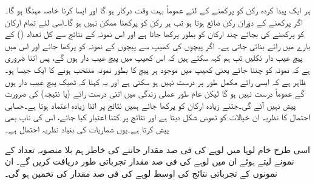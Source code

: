 ہر ایک پیدا کردہ رکن کو پرکھنے کے لئے عموماً بہت وقت درکار  ہو  گا اور ایسا کرنا خاصہ مہنگا ہو گا۔اگر پرکھنے کے دوران رکن ضائع ہوتا ہو تب ہر رکن کو پرکھنا ممکن نہیں ہو گا۔اسی لئے تمام ارکان کو پرکھنے کی بجائے چند ارکان کو بطور  پرکھا جاتا ہے اور اس نمونہ کے نتائج سے کل تعداد () کے بارے میں رائے بنائی جاتی ہے۔ اگر  پیچوں کی کھیپ  سے  پیچوں کے نمونہ کو پرکھا جائے اور اس میں  پیچ عیب دار نکلیں تب ہم کہہ سکتے ہیں کہ اس کھیپ میں  پیچ عیب دار ہوں گے، پس اتنا ضروری ہے کہ نمونہ کو   چننا جائے یعنی کھیپ میں موجود ہر پیچ کا بطور نمونہ منتخب ہونے کا  ایک جیسا ہو۔ظاہر ہے کہ ایسی رائے مکمل طور پر درست نہیں ہو سکتی ہے اور یہ کہنا کہ ٹھیک  پیچ عیب دار ہوں گے عموماً  درست نہیں ہو گا لیکن عام طور عملی زندگی میں اتنی درست رائے (یا نتیجہ)  کی ضرورت پیش نہیں آئے گی۔جتنے زیادہ ارکان کو پرکھا جائے ہمیں نتائج پر اتنا زیادہ اعتماد ہوتا ہے۔حسابی احتمال کا نظریہ ان خیالات کو ٹھوس شکل دیتا ہے اور نتائج پر کتنا اعتبار کیا جائے، اس کی ناپ بھی پیش کرتا ہے۔یوں شماریات کی بنیاد  نظریہ احتمال ہے۔

اسی طرح خام لوہا میں لوہے کی فی صد مقدار  جاننے کی خاطر ہم  بلا منصوبہ   تعداد کے  نمونے لیتے ہوئے ان میں لوہے کی فی صد مقدار تجرباتی طور دریافت  کریں گے۔  ان   نمونوں کے تجرباتی نتائج  کی اوسط  لوہے کی فی صد مقدار  کی تخمین ہو گی۔

